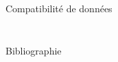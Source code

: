 \documentclass[aspectratio=169, french]{beamer}
\begin{document}
\begin{frame}{Compatibilité de données}
\begin{columns}
\begin{column}{.5\textwidth}
\begin{overlayarea}{\textwidth}{\textheight}
\begin{figure}
			\end{figure}
		\end{overlayarea}
		\end{column}
	\end{columns}	

\end{frame}


\begin{frame}{Bibliographie}
	\nocite{*}
	\printbibliography
\end{frame}
	
	
\end{document}
